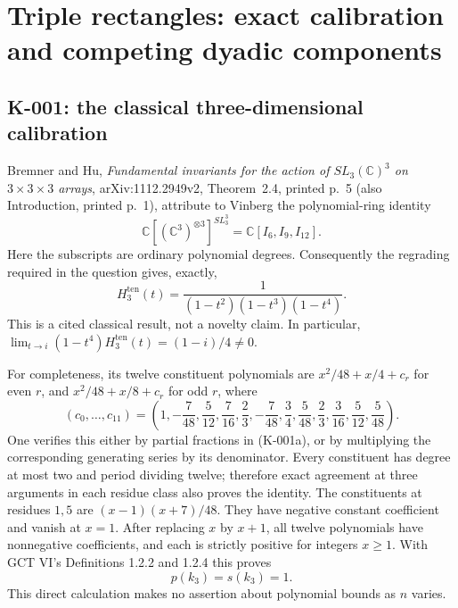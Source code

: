 \section{Triple rectangles: exact calibration and competing dyadic components}

\subsection{K-001: the classical three-dimensional calibration}
Bremner and Hu, \emph{Fundamental invariants for the action of
$SL_3(\mathbb C)^3$ on $3\times3\times3$ arrays}, arXiv:1112.2949v2,
Theorem~2.4, printed p.~5 (also Introduction, printed p.~1), attribute to Vinberg the polynomial-ring
identity
\[
 \mathbb C[(\mathbb C^3)^{\otimes3}]^{SL_3^3}
       =\mathbb C[I_6,I_9,I_{12}].
\]
Here the subscripts are ordinary polynomial degrees. Consequently the
regrading required in the question gives, exactly,
\[
 H^{\mathrm{ten}}_3(t)=\frac1{(1-t^2)(1-t^3)(1-t^4)}.                 \tag{K-001a}
\]
This is a cited classical result, not a novelty claim. In particular,
$\lim_{t\to i}(1-t^4)H^{\mathrm{ten}}_3(t)=(1-i)/4\ne0$.

For completeness, its twelve constituent polynomials are
$x^2/48+x/4+c_r$ for even $r$, and $x^2/48+x/8+c_r$ for odd $r$, where
\[
(c_0,\ldots,c_{11})=
\left(1,-\frac7{48},\frac5{12},\frac7{16},\frac23,-\frac7{48},
\frac34,\frac5{48},\frac23,\frac3{16},\frac5{12},\frac5{48}\right).
                                                               \tag{K-001b}
\]
One verifies this either by partial fractions in (K-001a), or by
multiplying the corresponding generating series by its denominator.
Every constituent has degree at most two and period dividing twelve;
therefore exact agreement at three arguments in each residue class
also proves the identity. The constituents at residues $1,5$ are
$(x-1)(x+7)/48$. They have negative constant coefficient and vanish at
$x=1$. After replacing $x$ by $x+1$, all twelve polynomials have
nonnegative coefficients, and each is strictly positive for integers
$x\ge1$. With GCT VI's Definitions 1.2.2 and 1.2.4 this proves
\[
                  p(k_3)=s(k_3)=1.                            \tag{K-001c}
\]
This direct calculation makes no assertion about polynomial bounds as
$n$ varies.

